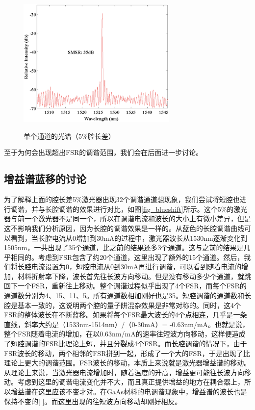 \documentclass{ZJUthesis}
\begin{document}
\begin{figure}[!ht]
  \centering
  \includegraphics[width=0.7\textwidth]{./Pictures/double_spectrum_32ch.eps}\\
  \caption{单个通道的光谱（5\%腔长差）}
  \label{fig_double_spectrum_32ch}
\end{figure}

至于为何会出现超出FSR的调谐范围，我们会在后面进一步讨论。

\subsection{增益谱蓝移的讨论}

为了解释上面的腔长差5\%激光器出现32个调谐通道想现象，我们尝试将短腔也进行调谐，并与长腔调谐的效果进行对比，如图\ref{fig_blueshift}所示。这个5\%的激光器与前一个激光器不是同一个，所以在调谐电流和波长的大小上有微小差异，但是这不影响我们分析原因，因为长腔的调谐效果是一样的。从蓝色的长腔调谐曲线可以看到，当长腔电流从0增加到30mA的过程中，激光器波长从1530nm逐渐变化到1505nm，一共出现了35个通道，比之前的结果还多3个通道。这与之前的结果是几乎相同的。考虑到FSR包含了约20个通道，这里出现了额外的15个通道。然后，我们将长腔电流设置为0，短腔电流从0到30mA再进行调谐，可以看到随着电流的增加，材料折射率下降，波长首先往长波方向移动。但是没有移动多少个通道，就跳回下一个FSR，重新往上移动。整个调谐过程似乎出现了4个FSR，而每个FSR的通道数分别为4、15、11、5。所有通道数相加刚好也是35。短腔调谐的通道数和长腔是基本一致的，这说明两个腔的量子阱混杂效果是非常对称的。同时，这4个FSR的整体波长在不断蓝移。如果将每个FSR最大波长的4个点相连，几乎是一条直线，斜率大约是（1533nm-1514nm）/（0-30mA）= -0.63nm/mA。也就是说，整个FSR随着电流的增加，在以0.63nm/mA的速率往短波方向移动，这样便造成了短腔调谐的FSR比理论上短，并且分裂成4个FSR。而长腔调谐的情况下，由于FSR波长的移动，两个相邻的FSR拼到一起，形成了一个大的FSR，于是出现了比理论上更大的调谐范围。FSR波长的移动，本质上来说就是激光器增益谱的移动。从理论上来说，当激光器电流增加时，随着温度的升高，增益更可能往长波方向移动。考虑到这里的调谐电流变化并不大，而且真正提供增益的地方在耦合器上，所以增益谱在这里应该不变才对。在GaAs材料的电调谐现象中，增益谱的波长也是保持不变的[ ]。而这里出现的往短波方向移动却刚好相反。
\end{document}
